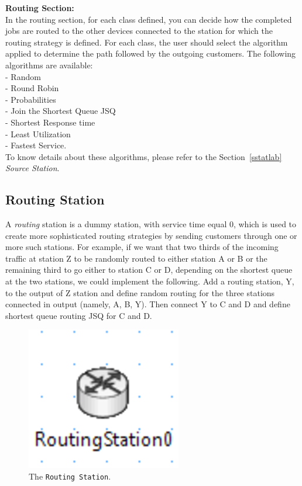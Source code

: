 \noindent \textbf{Routing Section:}\\ In the routing section, for each class
defined, you can decide how the completed jobs are routed to the
other devices connected to the station for which the routing
strategy is defined.
For each class, the user should select the algorithm applied to
determine the path followed by the outgoing customers.
The following algorithms are available:\\
- Random\\  - Round Robin\\ - Probabilities\\   - Join the Shortest Queue JSQ\\
- Shortest Response time\\ - Least Utilization\\  - Fastest Service.\\

\noindent To know details about these algorithms, please refer to the
Section~\ref{sstatlab} \emph{Source Station}.


\subsection{Routing Station}
 A \emph{routing} station is a dummy
station, with service time equal 0, which is used to create more
sophisticated routing strategies by sending customers through one
or more such stations. For example, if we want that two thirds of
the incoming traffic at station Z to be randomly routed to either
station A or B or the remaining third to go either to station C or
D, depending on the shortest queue at the two stations, we could
implement the following. Add a routing station, Y, to the output
of Z station and define random routing for the three stations
connected in output (namely, A, B, Y). Then connect Y to C and D
and define
shortest queue routing JSQ for C and D.\\
\begin{figure}[htb]
    \begin{center}
        \includegraphics[scale=.5]{img/jsimg/8.26.eps}
    \end{center}
    \caption{The \texttt{Routing Station}.}
    \label{fig:routstat}
\end{figure}

